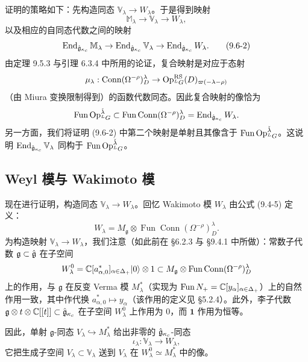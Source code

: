 证明的策略如下：先构造同态 $\mathbb{V}_\lambda\to W_\lambda$。于是得到映射
\begin{equation}
    \mathbb{M}_\lambda\to\mathbb{V}_\lambda\to W_\lambda,
    \tag{9.6-1}
\end{equation}
以及相应的自同态代数之间的映射
\begin{equation}
    \operatorname{End}_{\hat{\mathfrak{g}}_{\kappa_c}}\mathbb{M}_\lambda
    \to\operatorname{End}_{\hat{\mathfrak{g}}_{\kappa_c}}\mathbb{V}_\lambda
    \to\operatorname{End}_{\hat{\mathfrak{g}}_{\kappa_c}}W_\lambda .
    \tag{9.6-2}
\end{equation}
由定理 9.5.3 与引理 6.3.4 中所用的论证，复合映射是对应于态射
\[
    \mu_\lambda:\operatorname{Conn}(\Omega^{-\rho})^\lambda_D\to\operatorname{Op}^{\mathrm{RS}}_{{}^LG}(D)_{\varpi(-\lambda-\rho)}
\]
（由 Miura 变换限制得到）的函数代数同态。因此复合映射的像恰为
\[
    \operatorname{Fun}\operatorname{Op}^{\check\lambda}_{{}^LG}\subset\operatorname{Fun}\operatorname{Conn}(\Omega^{-\rho})^\lambda_D=\operatorname{End}_{\hat{\mathfrak{g}}_{\kappa_c}}W_\lambda .
\]
另一方面，我们将证明 (9.6-2) 中第二个映射是单射且其像含于 $\operatorname{Fun}\operatorname{Op}^{\check\lambda}_{{}^LG}$。这说明 $\operatorname{End}_{\hat{\mathfrak{g}}_{\kappa_c}}\mathbb{V}_\lambda$ 同构于 $\operatorname{Fun}\operatorname{Op}^{\check\lambda}_{{}^LG}$。

\subsection{Weyl 模与 Wakimoto 模}

现在进行证明，构造同态 $\mathbb{V}_\lambda\to W_\lambda$。回忆 Wakimoto 模 $W_\lambda$ 由公式 (9.4-5) 定义：
\begin{equation}
    W_\lambda=M_{\mathfrak{g}}\otimes\operatorname{Fun}\operatorname{Conn}(\Omega^{-\rho})^\lambda_D .
    \tag{9.6-3}
\end{equation}
为构造映射 $\mathbb{V}_\lambda\to W_\lambda$，我们注意（如此前在 §6.2.3 与 §9.4.1 中所做）：常数子代数 $\mathfrak{g}\subset\hat{\mathfrak{g}}$ 在子空间
\[
    W^0_\lambda=\mathbb{C}[a^*_{\alpha,0}]_{\alpha\in\Delta_+}|0\rangle\otimes1
    \subset M_{\mathfrak{g}}\otimes\operatorname{Fun}\operatorname{Conn}(\Omega^{-\rho})^\lambda_D
\]
上的作用，与 $\mathfrak{g}$ 在反变 Verma 模 $M^*_\lambda$（实现为 $\operatorname{Fun}N_+=\mathbb{C}[y_\alpha]_{\alpha\in\Delta_+}$）上的自然作用一致，其中作代换 $a^*_{\alpha,0}\mapsto y_\alpha$（该作用的定义见 §5.2.4）。此外，李子代数 $\mathfrak{g}\otimes t\otimes\mathbb{C}[[t]]\subset\hat{\mathfrak{g}}_{\kappa_c}$ 在子空间 $W^0_\lambda$ 上作用为 0，而 $\mathbf{1}$ 作用为恒等。

因此，单射 $\mathfrak{g}$-同态 $V_\lambda\hookrightarrow M^*_\lambda$ 给出非零的 $\hat{\mathfrak{g}}_{\kappa_c}$-同态
\[
    \iota_\lambda:\mathbb{V}_\lambda\to W_\lambda,
\]
它把生成子空间 $V_\lambda\subset\mathbb{V}_\lambda$ 送到 $V_\lambda$ 在 $W^0_\lambda\simeq M^*_\lambda$ 中的像。

